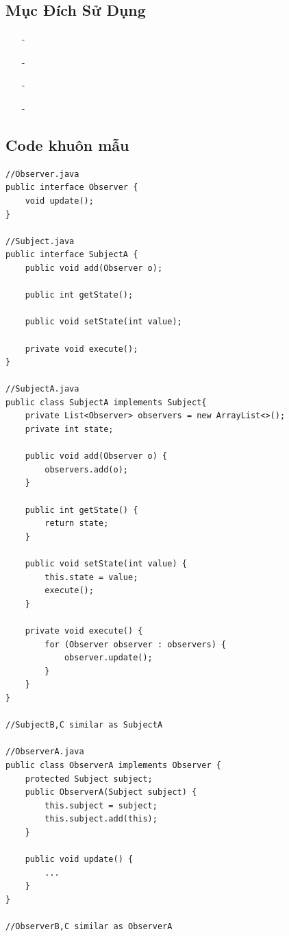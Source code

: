 \documentclass{article}
\newcommand\subpara{\fontsize{13}{13}\selectfont \fontseries{b}\selectfont}
\begin{document}
    \subsection{Mục Đích Sử Dụng}
    \begin{itemize}
        \item[-]\subpara{Thường được sử dụng trong mối quan hệ một - nhiều giữa các object với nhau. Trong đó, một đối tượng thay đổi và muốn thông báo cho tất cả các object liên quan biết về sự thay đổi đó}
        \item[-]\subpara{Sử dụng trong ứng dụng broadcast - type communication}
        \item[-]\subpara{Sử dụng để quản lý sự kiện (Event management)}
        \item[-]\subpara{Sử dụng trong mẫu mô hình MVC (Model View Controller Pattern)}
    \end{itemize}

    \subsection{Code khuôn mẫu}
    \begin{lstlisting}
//Observer.java
public interface Observer {
    void update();
}

//Subject.java
public interface SubjectA {
    public void add(Observer o);

    public int getState();

    public void setState(int value);

    private void execute();
}

//SubjectA.java
public class SubjectA implements Subject{
    private List<Observer> observers = new ArrayList<>();
    private int state;

    public void add(Observer o) {
        observers.add(o);
    }

    public int getState() {
        return state;
    }

    public void setState(int value) {
        this.state = value;
        execute();
    }

    private void execute() {
        for (Observer observer : observers) {
            observer.update();
        }
    }
}

//SubjectB,C similar as SubjectA

//ObserverA.java
public class ObserverA implements Observer {
    protected Subject subject;
    public ObserverA(Subject subject) {
        this.subject = subject;
        this.subject.add(this);
    }

    public void update() {
        ...
    }
}

//ObserverB,C similar as ObserverA

    \end{lstlisting}
\end{document}
